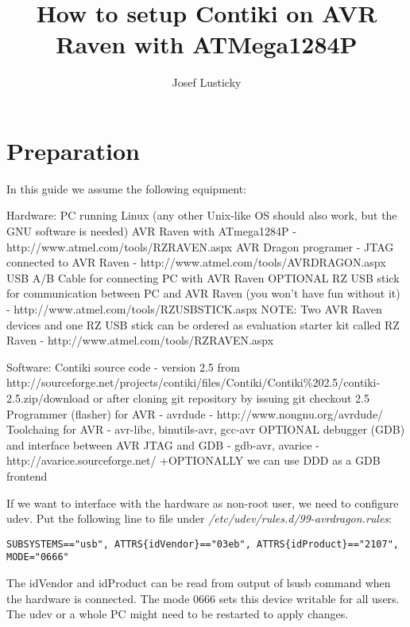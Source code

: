 \documentclass{article}
\begin{document}
\title{How to setup Contiki on AVR Raven with ATMega1284P}
\author{Josef Lusticky}

\maketitle

\section{Preparation}
In this guide we assume the following equipment:

Hardware:
PC running Linux (any other Unix-like OS should also work, but the GNU software is needed)
AVR Raven with ATmega1284P - http://www.atmel.com/tools/RZRAVEN.aspx
AVR Dragon programer - JTAG connected to AVR Raven - http://www.atmel.com/tools/AVRDRAGON.aspx
USB A/B Cable for connecting PC with AVR Raven
OPTIONAL RZ USB stick for communication between PC and AVR Raven (you won't have fun without it) - http://www.atmel.com/tools/RZUSBSTICK.aspx
NOTE: Two AVR Raven devices and one RZ USB stick can be ordered as evaluation starter kit called RZ Raven - http://www.atmel.com/tools/RZRAVEN.aspx




Software:
Contiki source code - version 2.5
	from\\
	http://sourceforge.net/projects/contiki/files/Contiki/Contiki\%202.5/contiki-2.5.zip/download
	or after cloning git repository by issuing git checkout 2.5
Programmer (flasher) for AVR - avrdude - http://www.nongnu.org/avrdude/
Toolchaing for AVR - avr-libc, binutils-avr, gcc-avr
OPTIONAL debugger (GDB) and interface between AVR JTAG and GDB - gdb-avr, avarice - http://avarice.sourceforge.net/
+OPTIONALLY we can use DDD as a GDB frontend


If we want to interface with the hardware as non-root user, we need to configure udev.
Put the following line to file under {\it{/etc/udev/rules.d/99-avrdragon.rules}}:
\begin{lstlisting}
SUBSYSTEMS=="usb", ATTRS{idVendor}=="03eb", ATTRS{idProduct}=="2107", MODE="0666"
\end{lstlisting}
The idVendor and idProduct can be read from output of lsusb command when the hardware is connected.
The mode 0666 sets this device writable for all users.
The udev or a whole PC might need to be restarted to apply changes.
\end{document}
